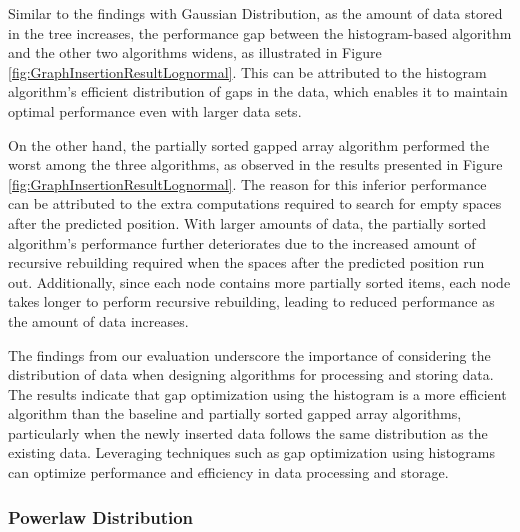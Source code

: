 Similar to the findings with Gaussian Distribution, as the amount of data stored in the \learnindex tree increases, the performance gap between the histogram-based algorithm and the other two algorithms widens, as illustrated in Figure \ref{fig:GraphInsertionResultLognormal}. This can be attributed to the histogram algorithm's efficient distribution of gaps in the data, which enables it to maintain optimal performance even with larger data sets.

On the other hand, the partially sorted gapped array algorithm performed the worst among the three algorithms, as observed in the results presented in Figure \ref{fig:GraphInsertionResultLognormal}. The reason for this inferior performance can be attributed to the extra computations required to search for empty spaces after the predicted position. With larger amounts of data, the partially sorted algorithm's performance further deteriorates due to the increased amount of recursive rebuilding required when the spaces after the predicted position run out. Additionally, since each node contains more partially sorted items, each node takes longer to perform recursive rebuilding, leading to reduced performance as the amount of data increases.

The findings from our evaluation underscore the importance of considering the distribution of data when designing algorithms for processing and storing data. The results indicate that gap optimization using the histogram is a more efficient algorithm than the baseline and partially sorted gapped array algorithms, particularly when the newly inserted data follows the same distribution as the existing data. Leveraging techniques such as gap optimization using histograms can optimize performance and efficiency in data processing and storage.

\subsubsection{Powerlaw Distribution}

